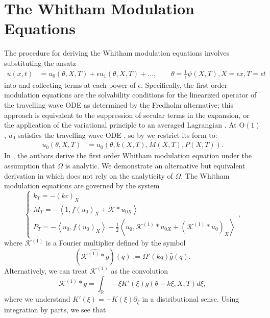 \documentclass[11pt,leqno]{article}
\numberwithin{equation}{section}
\newcommand{\R}{\mathbb R}
\newcommand\LA{\left\langle}
\newcommand\RA{\right\rangle}
\theoremstyle{definition}
\begin{document}
\section{The Whitham Modulation Equations}\label{S:WModEqns}
The procedure for deriving the Whitham modulation equations involves substituting the ansatz
\begin{align*}
	u(x,t) &= u_{0}(\theta,X,T) + \epsilon u_{1}(\theta,X,T) + \dots,\qquad \theta = \frac{1}{\epsilon}\psi(X,T), X=\epsilon x, T=\epsilon t
\end{align*}
into  and collecting terms at each power of $ \epsilon $. Specifically, the first order modulation equations are the solvability conditions for the linearized operator of the travelling wave ODE as determined by the Fredholm alternative; this approach is equivalent to the suppression of secular terms in the expansion, or the application of the variational principle to an averaged Lagrangian \cite{L66,Whitham1970,Whitham1999}. At O$ (1) $, $ u_{0} $ satisfies the travelling wave ODE , so by  we restrict its form to:
\begin{align*}
	u_{0}(\theta,X,T) &= u_{0}(\theta,k(X,T),M(X,T),P(X,T)).
\end{align*}
In \cite{BIHS2021}, the authors derive the first order Whitham modulation equation under the assumption that $ \Omega $ is analytic. We demonstrate an alternative but equivalent derivation in  which does not rely on the analyticity of $ \Omega $. The Whitham modulation equations are governed by the system \cite{BIHS2021}
\begin{equation}\label{e:whitmodsystem}
\begin{cases}
k_T = -(kc)_X\\
M_T = -\LA 1, f(u_0)_{X} + \mathcal{K}*u_{0X}\RA\\
P_T = -\LA u_{0}, f(u_{0})_{X}\RA - \frac{1}{2}\LA u_0, \mathcal{K}^{(1)}*u_{0X} + (\mathcal{K}^{(1)}*u_{0})_{X}\RA
\end{cases},
\end{equation}
where $\mathcal{K}^{(1)}$ is a Fourier multiplier defined by the symbol
\begin{equation}\label{e:K1}
(\widehat{\mathcal{K}^{(1)}*g})(q) := \Omega'(kq)\widehat{g}(q).
\end{equation}
Alternatively, we can treat $\mathcal{K}^{(1)}$ as the convolution
\[
	\mathcal{K}^{(1)}*g = \int_{\R}-\xi K'(\xi)g(\theta - k\xi,X,T)d\xi,
\]
where we understand $ K'(\xi) = -K(\xi)\partial_{\xi} $ in a distributional sense. Using integration by parts, we see that
\end{document}
